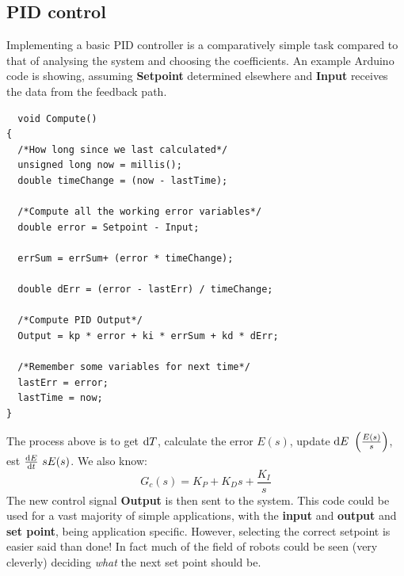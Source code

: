 \documentclass[class=report, crop=false, 12pt,a4paper]{standalone}
\begin{document}
\subsection{PID control}
Implementing a basic PID controller is a comparatively simple task compared to that of analysing the system and choosing the coefficients. An example Arduino code is showing, assuming \textbf{Setpoint} determined elsewhere and \textbf{Input} receives the data from the feedback path.
\begin{verbatim}
  void Compute()
{
  /*How long since we last calculated*/
  unsigned long now = millis();
  double timeChange = (now - lastTime);

  /*Compute all the working error variables*/
  double error = Setpoint - Input;

  errSum = errSum+ (error * timeChange);

  double dErr = (error - lastErr) / timeChange;

  /*Compute PID Output*/
  Output = kp * error + ki * errSum + kd * dErr;

  /*Remember some variables for next time*/
  lastErr = error;
  lastTime = now;
}
\end{verbatim}
The process above is to get $\dif T$, calculate the error $E(s)$, update $\dif E \ \left(\frac{E(s)}{s}\right)$, est $\frac{\dif E}{\dif t} \ sE(s)$. We also know:
\begin{equation}
  G_c (s) = K_P + K_D s + \frac{K_I}{s}
\end{equation}
The new control signal \textbf{Output} is then sent to the system. This code could be used for a vast majority of simple applications, with the \textbf{input} and \textbf{output} and \textbf{set point}, being application specific. However, selecting the correct setpoint is easier said than done! In fact much of the field of robots could be seen (very cleverly) deciding \textit{what} the next set point should be. 
\end{document}
